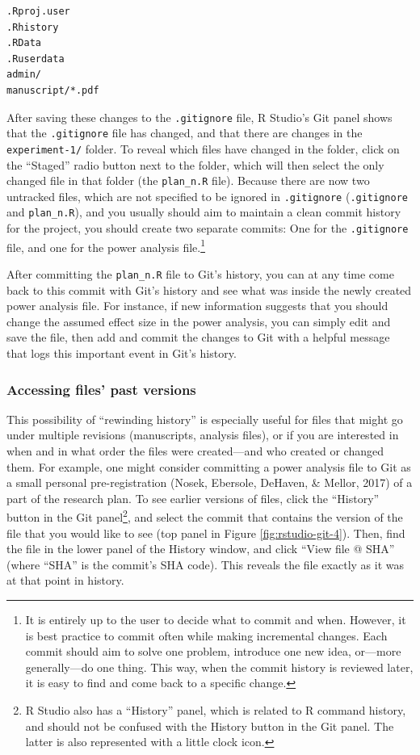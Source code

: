 \documentclass[
  american,
  ,doc,floatsintext]{apa6}
\begin{document}
\begin{verbatim}
.Rproj.user
.Rhistory
.RData
.Ruserdata
admin/
manuscript/*.pdf
\end{verbatim}

After saving these changes to the \texttt{.gitignore} file, R Studio's Git panel shows that the \texttt{.gitignore} file has changed, and that there are changes in the \texttt{experiment-1/} folder. To reveal which files have changed in the folder, click on the \enquote{Staged} radio button next to the folder, which will then select the only changed file in that folder (the \texttt{plan\_n.R} file). Because there are now two untracked files, which are not specified to be ignored in \texttt{.gitignore} (\texttt{.gitignore} and \texttt{plan\_n.R}), and you usually should aim to maintain a clean commit history for the project, you should create two separate commits: One for the \texttt{.gitignore} file, and one for the power analysis file.\footnote{It is entirely up to the user to decide what to commit and when. However, it is best practice to commit often while making incremental changes. Each commit should aim to solve one problem, introduce one new idea, or---more generally---do one thing. This way, when the commit history is reviewed later, it is easy to find and come back to a specific change.}

After committing the \texttt{plan\_n.R} file to Git's history, you can at any time come back to this commit with Git's history and see what was inside the newly created power analysis file. For instance, if new information suggests that you should change the assumed effect size in the power analysis, you can simply edit and save the file, then add and commit the changes to Git with a helpful message that logs this important event in Git's history.

\hypertarget{accessing-files-past-versions}{%
\subsubsection{Accessing files' past versions}\label{accessing-files-past-versions}}

This possibility of \enquote{rewinding history} is especially useful for files that might go under multiple revisions (manuscripts, analysis files), or if you are interested in when and in what order the files were created---and who created or changed them. For example, one might consider committing a power analysis file to Git as a small personal pre-registration (Nosek, Ebersole, DeHaven, \& Mellor, 2017) of a part of the research plan. To see earlier versions of files, click the \enquote{History} button in the Git panel\footnote{R Studio also has a \enquote{History} panel, which is related to R command history, and should not be confused with the History button in the Git panel. The latter is also represented with a little clock icon.}, and select the commit that contains the version of the file that you would like to see (top panel in Figure \ref{fig:rstudio-git-4}). Then, find the file in the lower panel of the History window, and click \enquote{View file @ SHA} (where \enquote{SHA} is the commit's SHA code). This reveals the file exactly as it was at that point in history.
\end{document}
